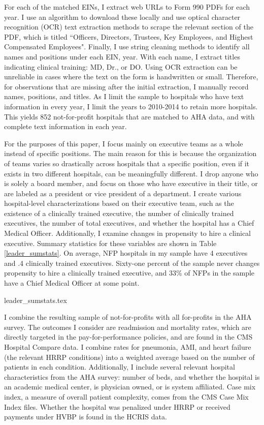 \documentclass[12pt]{article}
\begin{document}
    For each of the matched EINs, I extract web URLs to Form 990 PDFs for each year. I use an algorithm to download these locally and use optical character recognition (OCR) text extraction methods to scrape the relevant section of the PDF, which is titled ``Officers, Directors, Trustees, Key Employees, and Highest Compensated Employees". Finally, I use string cleaning methods to identify all names and positions under each EIN, year. With each name, I extract titles indicating clinical training: MD, Dr., or DO. Using OCR extraction can be unreliable in cases where the text on the form is handwritten or small. Therefore, for observations that are missing after the initial extraction, I manually record names, positions, and titles. As I limit the sample to hospitals who have text information in every year, I limit the years to 2010-2014 to retain more hospitals. This yields 852 not-for-profit hospitals that are matched to AHA data, and with complete text information in each year. 

    For the purposes of this paper, I focus mainly on executive teams as a whole instead of specific positions. The main reason for this is because the organization of teams varies so drastically across hospitals that a specific position, even if it exists in two different hospitals, can be meaningfully different. I drop anyone who is solely a board member, and focus on those who have executive in their title, or are labeled as a president or vice president of a department. I create various hospital-level characterizations based on their executive team, such as the existence of a clinically trained executive, the number of clinically trained executives, the number of total executives, and whether the hospital has a Chief Medical Officer. Additionally, I examine changes in propensity to hire a clinical executive. Summary statistics for these variables are shown in Table \ref{leader_sumstats}. On average, NFP hospitals in my sample have 4 executives and .4 clinically trained executives. Sixty-one percent of the sample never changes propensity to hire a clinically trained executive, and 33\% of NFPs in the sample have a Chief Medical Officer at some point. 

    {leader_sumstats.tex}

    I combine the resulting sample of not-for-profits with all for-profits in the AHA survey. The outcomes I consider are readmission and mortality rates, which are directly targeted in the pay-for-performance policies, and are found in the CMS Hospital Compare data. I combine rates for pneumonia, AMI, and heart failure (the relevant HRRP conditions) into a weighted average based on the number of patients in each condition. Additionally, I include several relevant hospital characteristics from the AHA survey: number of beds, and whether the hospital is an academic medical center, is physician owned, or is system affiliated. Case mix index, a measure of overall patient complexity, comes from the CMS Case Mix Index files. Whether the hospital was penalized under HRRP or received payments under HVBP is found in the HCRIS data. 
\end{document}
